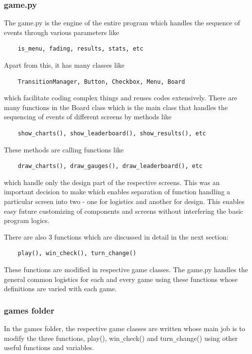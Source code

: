 \documentclass[12pt, a4paper]{article}
\begin{document}
    \subsubsection*{game.py}
The game.py is the engine of the entire program which handles the sequence of events through various parameters like
\begin{lstlisting}
    is_menu, fading, results, stats, etc
\end{lstlisting}

Apart from this, it has many classes like
\begin{lstlisting}
    TransitionManager, Button, Checkbox, Menu, Board
\end{lstlisting}
which facilitate coding complex things and reuses codes extensively. There are many functions in the Board class which is the main class that handles the sequencing of events of different screens by methods like
\begin{lstlisting}
    show_charts(), show_leaderboard(), show_results(), etc
\end{lstlisting}
These methods are calling functions like
\begin{lstlisting}
    draw_charts(), draw_gauges(), draw_leaderboard(), etc
\end{lstlisting}
which handle only the design part of the respective screens. This was an important decision to make which enables separation of function handling a particular screen into two - one for logistics and another for design. This enables easy future customizing of components and screens without interfering the basic program logics.

There are also 3 functions which are discussed in detail in the next section:
\begin{lstlisting}
    play(), win_check(), turn_change()
\end{lstlisting}
These functions are modified in respective game classes. The game.py handles the general common logistics for each and every game using these functions whose definitions are varied with each game.

\subsubsection*{games folder}
In the games folder, the respective game classes are written whose main job is to modify the three functions, play(), win\texttt{\_}check() and turn\texttt{\_}change() using other useful functions and variables.
\end{document}
